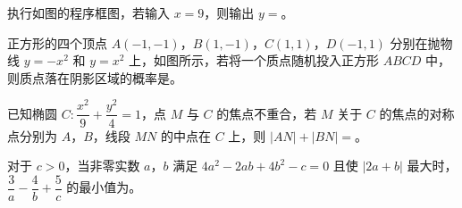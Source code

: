 \Needspace{0.4\textheight}
\begin{question}
执行如图的程序框图，若输入 $x=9$，则输出 $y=$\gkblank{}。
\nopagebreak[4]
\begin{center}\end{center}
\nopagebreak[4]
\Needspace{0.4\textheight}
\end{question}
\begin{question}
正方形的四个顶点 $A(-1,-1)$，$B(1,-1)$，$C(1,1)$，$D(-1,1)$ 分别在抛物线 $y=-x^2$ 和 $y=x^2$ 上，如图所示，若将一个质点随机投入正方形 $ABCD$ 中，则质点落在阴影区域的概率是\gkblank{}。
\nopagebreak[4]
\begin{center}\end{center}
\nopagebreak[4]
\end{question}
\begin{question}
已知椭圆 $C:\dfrac{x^2}9+\dfrac{y^2}4=1$，点 $M$ 与 $C$ 的焦点不重合，若 $M$ 关于 $C$ 的焦点的对称点分别为 $A$，$B$，线段 $MN$ 的中点在 $C$ 上，则 $|AN|+|BN|=$\gkblank{}。

\end{question}
\begin{question}
对于 $c>0$，当非零实数 $a$，$b$ 满足 $4a^2-2ab+4b^2-c=0$ 且使 $|2a+b|$ 最大时，$\dfrac3a-\dfrac4b+\dfrac5c$ 的最小值为\gkblank{}。

\end{question}

